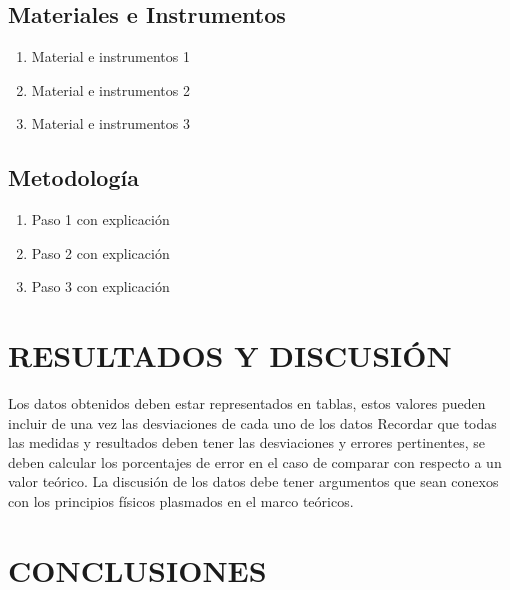 \documentclass[fleqn,10pt]{SelfArx}
\begin{document}
\subsection{Materiales e Instrumentos}
\begin{enumerate}[noitemsep] 

\item Material e instrumentos 1
\item Material e instrumentos 2
\item Material e instrumentos 3

\end{enumerate}


\subsection{Metodología}
\begin{enumerate}[noitemsep] 

\item Paso 1 con explicación
\item Paso 2 con explicación
\item Paso 3 con explicación

\end{enumerate}

\section{RESULTADOS Y DISCUSIÓN}

Los datos obtenidos deben estar representados en tablas, estos valores pueden incluir de una vez las desviaciones de cada uno de los datos
Recordar que todas las medidas y resultados deben tener las desviaciones y errores pertinentes, se deben calcular los porcentajes de error  en el caso de comparar con respecto a un valor teórico.
La discusión de los datos debe tener argumentos que sean conexos con los principios físicos plasmados en el marco teóricos.

\section{CONCLUSIONES}








\end{document}
